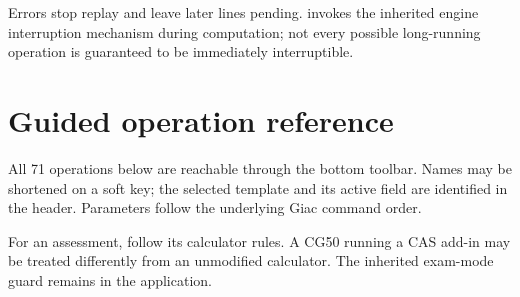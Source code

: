 \documentclass[11pt,a4paper]{article}
\newcommand{\key}[1]{\textsf{\fbox{\strut\scriptsize #1}}}
\newcommand{\note}[1]{\par\colorbox{pale}{\parbox{0.95\linewidth}{\small #1}}\par}
\begin{document}
Errors stop replay and leave later lines pending. \key{AC} invokes the inherited engine interruption mechanism during computation; not every possible long-running operation is guaranteed to be immediately interruptible.
\clearpage
\appendix
\section{Guided operation reference}
All 71 operations below are reachable through the bottom toolbar. Names may be shortened on a soft key; the selected template and its active field are identified in the header. Parameters follow the underlying Giac command order.

\note{For an assessment, follow its calculator rules. A CG50 running a CAS add-in may be treated differently from an unmodified calculator. The inherited exam-mode guard remains in the application.}
\end{document}
